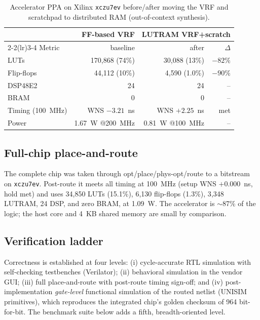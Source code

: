 \documentclass[conference]{IEEEtran}
\begin{document}
\begin{table}[t]
\caption{Accelerator PPA on Xilinx \texttt{xczu7ev} before/after moving the VRF
and scratchpad to distributed RAM (out-of-context synthesis).}
\label{tab:ppa}
\centering
\footnotesize
\begin{tabular}{lrrr}
\toprule
 & FF-based VRF & \multicolumn{2}{c}{LUTRAM VRF+scratch}\\
\cmidrule(lr){2-2}\cmidrule(lr){3-4}
Metric & baseline & after & $\Delta$\\
\midrule
LUTs            & 170{,}868 (74\%) & 30{,}088 (13\%) & $-82\%$\\
Flip-flops      & 44{,}112 (10\%)  & 4{,}590 (1.0\%) & $-90\%$\\
DSP48E2         & 24               & 24             & --\\
BRAM            & 0                & 0              & --\\
Timing (100~MHz)& WNS $-3.21$~ns   & WNS $+2.25$~ns & met\\
Power           & 1.67~W @200~MHz  & 0.81~W @100~MHz& --\\
\bottomrule
\end{tabular}
\end{table}

\subsection{Full-chip place-and-route}
The complete chip was taken through opt/place/phys-opt/route to a bitstream on
\texttt{xczu7ev}. Post-route it meets all timing at 100~MHz (setup
WNS $+0.000$~ns, hold met) and uses 34{,}850 LUTs (15.1\%), 6{,}130 flip-flops
(1.3\%), 3{,}348 LUTRAM, 24 DSP, and zero BRAM, at 1.09~W. The accelerator is
$\sim$87\% of the logic; the host core and 4~KB shared memory are small by
comparison.

\subsection{Verification ladder}
Correctness is established at four levels: (i) cycle-accurate RTL simulation with
self-checking testbenches (Verilator); (ii) behavioral simulation in the vendor
GUI; (iii) full place-and-route with post-route timing sign-off; and (iv)
post-implementation \emph{gate-level} functional simulation of the routed netlist
(UNISIM primitives), which reproduces the integrated chip's golden checksum of
964 bit-for-bit. The benchmark suite below adds a fifth, breadth-oriented level.
\end{document}
